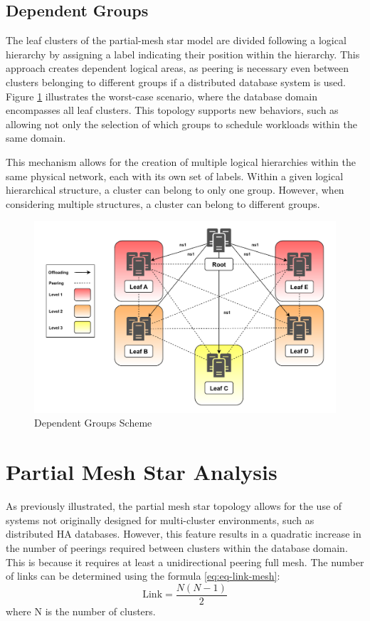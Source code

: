\subsection{Dependent Groups}
The leaf clusters of the partial-mesh star model are divided following a logical hierarchy by assigning a label indicating their position within the hierarchy. This approach creates dependent logical areas, as peering is necessary even between clusters belonging to different groups if a distributed database system is used. Figure \ref{fig:group-dep} illustrates the worst-case scenario, where the database domain encompasses all leaf clusters. This topology supports new behaviors, such as allowing not only the selection of which groups to schedule workloads within the same domain.

This mechanism allows for the creation of multiple logical hierarchies within the same physical network, each with its own set of labels. Within a given logical hierarchical structure, a cluster can belong to only one group. However, when considering multiple structures, a cluster can belong to different groups.

\begin{figure}[ht]\centering
\includegraphics[scale=0.7]{Pictures/Level-v4}
\caption{Dependent Groups Scheme}\label{fig:group-dep}
\end{figure}

\section{Partial Mesh Star Analysis}
As previously illustrated, the partial mesh star topology allows for the use of systems not originally designed for multi-cluster environments, such as distributed HA databases. However, this feature results in a quadratic increase in the number of peerings required between clusters within the database domain. This is because it requires at least a unidirectional peering full mesh. The number of links can be determined using the formula \eqref{eq:eq-link-mesh}:
\begin{equation} \label{eq:eq-link-mesh}
\text{Link} = \frac{N(N-1)}{2}
\end{equation}
where N is the number of clusters.


